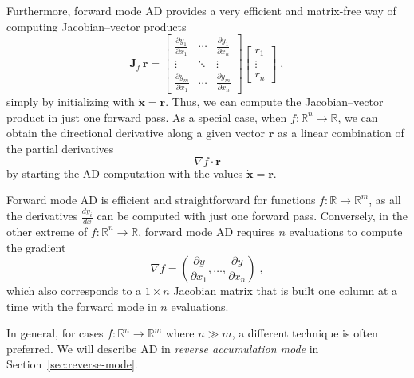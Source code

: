 \documentclass[twoside,11pt]{article}
\begin{document}
Furthermore, forward mode AD provides a very efficient and matrix-free way of computing Jacobian--vector products
\begin{equation}
  \mathbf{J}_f\,\mathbf{r} = \begin{bmatrix}
                    \frac{\partial y_1}{\partial x_1} & \cdots & \frac{\partial y_1}{\partial x_n} \\
                    \vdots & \ddots & \vdots \\
                    \frac{\partial y_m}{\partial x_1} & \cdots & \frac{\partial y_m}{\partial x_n}
                   \end{bmatrix}
                   \begin{bmatrix}
                    r_1 \\
                    \vdots \\
                    r_n
                   \end{bmatrix}\; ,
\label{EquationJacobianVectorProduct}
\end{equation}
simply by initializing with $\dot{\mathbf{x}}=\mathbf{r}$. Thus, we can compute the Jacobian--vector product in just one forward pass. As a special case, when $f: \mathbb{R}^n \to \mathbb{R}$, we can obtain the directional derivative along a given vector $\mathbf{r}$ as a linear combination of the partial derivatives
\begin{equation*}
  \nabla f \cdot \mathbf{r}
\end{equation*}
by starting the AD computation with the values $\dot{\mathbf{x}}=\mathbf{r}$.

Forward mode AD is efficient and straightforward for functions $f: \mathbb{R} \to \mathbb{R}^m$, as all the derivatives $\frac{d y_i}{d x}$ can be computed with just one forward pass. Conversely, in the other extreme of $f: \mathbb{R}^n \to \mathbb{R}$, forward mode AD requires $n$ evaluations to compute the gradient
\begin{equation*}
  \nabla f = \left( \frac{\partial y}{\partial x_1}, \dots, \frac{\partial y}{\partial x_n}\right)\; ,
\end{equation*}
which also corresponds to a $1 \times n$ Jacobian matrix that is built one column at a time with the forward mode in $n$ evaluations.

In general, for cases $f: \mathbb{R}^n \to \mathbb{R}^m$ where $n \gg m$, a different technique is often preferred.
We will describe AD in \emph{reverse accumulation mode} in Section~\ref{sec:reverse-mode}.
\end{document}
